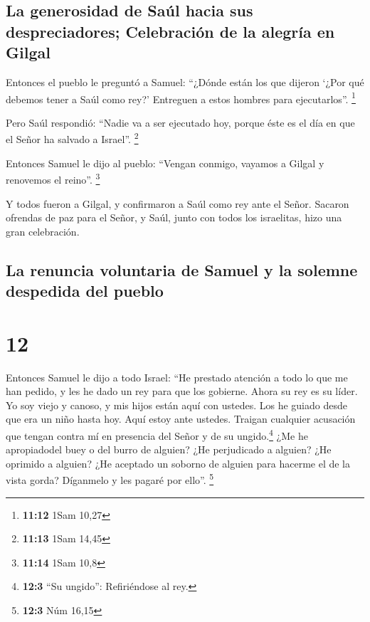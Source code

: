 \hypertarget{la-generosidad-de-sauxfal-hacia-sus-despreciadores-celebraciuxf3n-de-la-alegruxeda-en-gilgal}{%
\subsection{La generosidad de Saúl hacia sus despreciadores; Celebración
de la alegría en
Gilgal}\label{la-generosidad-de-sauxfal-hacia-sus-despreciadores-celebraciuxf3n-de-la-alegruxeda-en-gilgal}}

 Entonces el pueblo le preguntó a Samuel: ``¿Dónde están
los que dijeron `¿Por qué debemos tener a Saúl como rey?' Entreguen a
estos hombres para ejecutarlos''. \footnote{\textbf{11:12} 1Sam 10,27}

 Pero Saúl respondió: ``Nadie va a ser ejecutado hoy,
porque éste es el día en que el Señor ha salvado a Israel''. \footnote{\textbf{11:13}
  1Sam 14,45}

 Entonces Samuel le dijo al pueblo: ``Vengan conmigo,
vayamos a Gilgal y renovemos el reino''. \footnote{\textbf{11:14} 1Sam
  10,8}

 Y todos fueron a Gilgal, y confirmaron a Saúl como rey
ante el Señor. Sacaron ofrendas de paz para el Señor, y Saúl, junto con
todos los israelitas, hizo una gran celebración.

\hypertarget{la-renuncia-voluntaria-de-samuel-y-la-solemne-despedida-del-pueblo}{%
\subsection{La renuncia voluntaria de Samuel y la solemne despedida del
pueblo}\label{la-renuncia-voluntaria-de-samuel-y-la-solemne-despedida-del-pueblo}}

\hypertarget{section-11}{%
\section{12}\label{section-11}}

 Entonces Samuel le dijo a todo Israel: ``He prestado
atención a todo lo que me han pedido, y les he dado un rey para que los
gobierne.  Ahora su rey es su líder. Yo soy viejo y
canoso, y mis hijos están aquí con ustedes. Los he guiado desde que era
un niño hasta hoy.  Aquí estoy ante ustedes. Traigan
cualquier acusación que tengan contra mí en presencia del Señor y de su
ungido.\footnote{\textbf{12:3} ``Su ungido'': Refiriéndose al rey.} ¿Me
he apropiadodel buey o del burro de alguien? ¿He perjudicado a alguien?
¿He oprimido a alguien? ¿He aceptado un soborno de alguien para hacerme
el de la vista gorda? Díganmelo y les pagaré por ello''. \footnote{\textbf{12:3}
  Núm 16,15}

